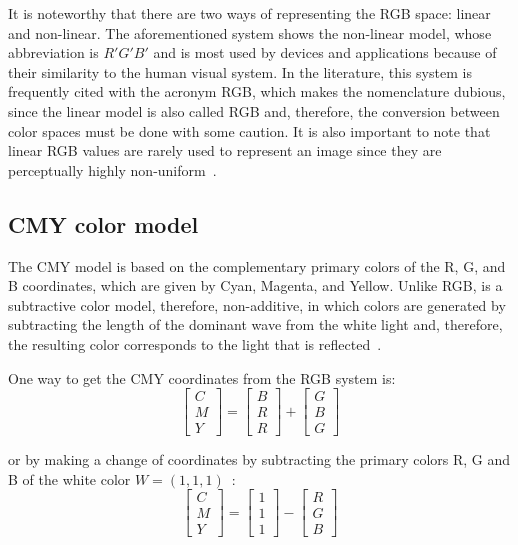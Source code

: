 It is noteworthy that there are two ways of representing the RGB space: linear and non-linear. The aforementioned system shows the non-linear model, whose abbreviation is $R'G'B'$ and is most used by devices and applications because of their similarity to the human visual system. In the literature, this system is frequently cited with the acronym RGB, which makes the nomenclature dubious, since the linear model is also called RGB and, therefore, the conversion between color spaces must be done with some caution. It is also important to note that linear RGB values are rarely used to represent an image since they are perceptually highly non-uniform~\citep{konstantinos:00}.


\subsection{CMY color model}
\label{sec:modelo_cores_cmy}

The CMY model is based on the complementary primary colors of the R, G, and B coordinates, which are given by Cyan, Magenta, and Yellow. Unlike RGB, is a subtractive color model, therefore, non-additive, in which colors are generated by subtracting the length of the dominant wave from the white light and, therefore, the resulting color corresponds to the light that is reflected~\citep{gonzalez:02}.

One way to get the CMY coordinates from the RGB system is:\\
\begin{equation}
  \begin{bmatrix}
    C \\ M \\ Y
  \end{bmatrix} = 
  \begin{bmatrix}
    B \\ R \\ R
  \end{bmatrix} +
  \begin{bmatrix}
    G \\ B \\ G
  \end{bmatrix}
\end{equation}

\noindent or by making a change of coordinates by subtracting the primary colors R, G and B of the white color $W = (1, 1, 1)$~\citep{gonzalez:02}:
\begin{equation}
  \begin{bmatrix}
    C \\ M \\ Y
  \end{bmatrix} = 
  \begin{bmatrix}
    1 \\ 1 \\ 1
  \end{bmatrix} -
  \begin{bmatrix}
    R \\ G \\ B
  \end{bmatrix}
\end{equation}

